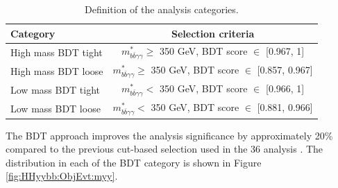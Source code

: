 \begin{table}[htbp]
    \centering
    \begin{tabular}{lc}
    \hline\hline
        Category & Selection criteria \\
    \hline
    High mass BDT tight & $m_{b \bar{b} \gamma \gamma}^{*} \geq$ 350 GeV, BDT score $\in$ [0.967, 1] \\
    High mass BDT loose & $m_{b \bar{b} \gamma \gamma}^{*} \geq$ 350 GeV, BDT score $\in$ [0.857, 0.967] \\
    Low mass BDT tight & $m_{b \bar{b} \gamma \gamma}^{*} <$ 350 GeV, BDT score $\in$ [0.966, 1] \\
    Low mass BDT loose & $m_{b \bar{b} \gamma \gamma}^{*} <$ 350 GeV, BDT score $\in$ [0.881, 0.966] \\
     \hline\hline
    \end{tabular}
    \caption{Definition of the analysis categories.}
    \label{tab:HHyybb:ObjEvt:Evt:Cat}
\end{table}
The BDT approach improves the analysis significance by approximately 20\% compared to the previous cut-based selection used in the 36 \ifb analysis \cite{yybb_36ifb}. The \myy distribution in each of the BDT category is shown in Figure \ref{fig:HHyybb:ObjEvt:myy}. \\ 
